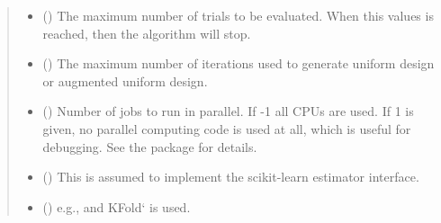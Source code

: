 \documentclass[letterpaper,10pt,english]{sphinxmanual}
\begin{document}
\begin{fulllineitems}
\begin{quote}
\begin{description}
\begin{itemize}
\item {} 
 (\sphinxstyleliteralemphasis{\sphinxupquote{, }}\sphinxstyleliteralemphasis{\sphinxupquote{, }}) \textendash{} The maximum number of trials to be evaluated. When this values is reached, 
then the algorithm will stop.

\item {} 
 (\sphinxstyleliteralemphasis{\sphinxupquote{, }}\sphinxstyleliteralemphasis{\sphinxupquote{, }}) \textendash{} The maximum number of iterations used to generate uniform design or augmented uniform design.

\item {} 
 (\sphinxstyleliteralemphasis{\sphinxupquote{, }}\sphinxstyleliteralemphasis{\sphinxupquote{, }}\sphinxstyleliteralemphasis{\sphinxupquote{, }}) \textendash{} Number of jobs to run in parallel.
If -1 all CPUs are used. If 1 is given, no parallel computing code
is used at all, which is useful for debugging. See the package  for details.

\item {} 
 () \textendash{} This is assumed to implement the scikit-learn estimator interface.

\item {} 
 (\sphinxstyleliteralemphasis{\sphinxupquote{, }}) \textendash{} e.g.,  and KFold{}` is used.


\end{itemize}
\end{description}
\end{quote}
\end{fulllineitems}
\end{document}
